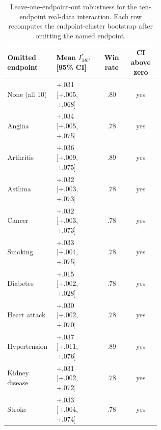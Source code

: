 \begin{table}[H]
\caption{Leave-one-endpoint-out robustness for the ten-endpoint real-data interaction. Each row recomputes the endpoint-cluster bootstrap after omitting the named endpoint.}
\label{tab:app-composition-loo}
\label{tab:app_loo}
\centering\scriptsize
\setlength{\tabcolsep}{6pt}
\begin{tabular}{P{0.32\linewidth}P{0.30\linewidth}cc}
\toprule Omitted endpoint & Mean $I^*_{MC}$ [95\% CI] & Win rate & CI above zero \\
\midrule
None (all 10) & +.031 [+.005, +.068] & .80 & yes \\
Angina & +.034 [+.005, +.075] & .78 & yes \\
Arthritis & +.036 [+.009, +.075] & .89 & yes \\
Asthma & +.032 [+.003, +.073] & .78 & yes \\
Cancer & +.032 [+.003, +.073] & .78 & yes \\
Smoking & +.033 [+.004, +.075] & .78 & yes \\
Diabetes & +.015 [+.002, +.028] & .78 & yes \\
Heart attack & +.030 [+.002, +.070] & .78 & yes \\
Hypertension & +.037 [+.011, +.076] & .89 & yes \\
Kidney disease & +.031 [+.002, +.072] & .78 & yes \\
Stroke & +.033 [+.004, +.074] & .78 & yes \\
\bottomrule\end{tabular}
\end{table}
